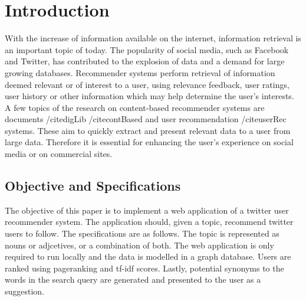 \section{Introduction}
\label{sec:intro}

With the increase of information available on the internet, information retrieval is an important topic of today. The popularity of social media, such as Facebook and Twitter, has contributed to the explosion of data and a demand for large growing databases. Recommender systems perform retrieval of information deemed relevant or of interest to a user, using relevance feedback, user ratings, user history or other information which may help determine the user’s interests. A few topics of the research on content-based recommender systems are documents /cite{digLib} /cite{contBased} and user recommendation /cite{userRec} systems. These aim to quickly extract and present relevant data to a user from large data. Therefore it is essential for enhancing the user’s experience on social media or on commercial sites.  

\subsection{Objective and Specifications}
The objective of this paper is to implement a web application of a twitter user recommender system. The application should, given a topic, recommend twitter users to follow. The specifications are as follows. The topic is represented as nouns or adjcetives, or a combination of both. The web application is only required to run locally and the data is modelled in a graph database. Users are ranked using pageranking and tf-idf scores. Lastly, potential synonyms to the words in the search query are generated and presented to the user as a suggestion.



